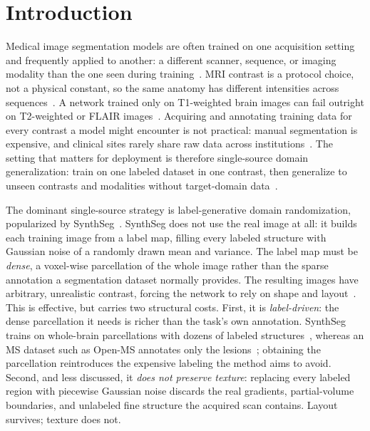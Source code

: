 \section{Introduction}
\label{sec:intro}

Medical image segmentation models are often trained on one acquisition
setting~\cite{guan2022dasurvey} and frequently applied to another: a different
scanner, sequence, or imaging modality than the one seen during
training~\cite{ghafoorian2017transfer,karani2018lifelong}. MRI contrast is a
protocol choice, not a physical constant, so the same anatomy has different
intensities across sequences~\cite{bitar2006pulsesequences}. A network trained only on
T1-weighted brain images can fail outright on T2-weighted or FLAIR
images~\cite{billot2023synthseg}. Acquiring and
annotating training data for every contrast a model might encounter is not
practical: manual segmentation is expensive, and clinical sites rarely share
raw data across institutions~\cite{liu2021feddg,wang2020dofe}. The setting that matters for deployment is therefore single-source domain
generalization: train on one labeled dataset in one contrast, then generalize
to unseen contrasts and modalities without target-domain
data~\cite{zhang2020bigaug,ouyang2022gin,su2023slaug,xu2021randconv}.

The dominant single-source strategy is label-generative domain randomization,
popularized by SynthSeg~\cite{billot2023synthseg}. SynthSeg does not use the
real image at all: it builds each training image from a label map, filling
every labeled structure with Gaussian noise of a randomly drawn mean and
variance. The label map must be \emph{dense}, a voxel-wise parcellation of
the whole image rather than the sparse annotation a segmentation dataset
normally provides. The resulting images have arbitrary, unrealistic contrast,
forcing the network to rely on shape and layout~\cite{billot2023synthseg}.
This is effective, but carries two structural costs. First, it is
\emph{label-driven}: the dense parcellation it needs is richer than the task's
own annotation. SynthSeg trains on whole-brain parcellations with dozens of
labeled structures~\cite{billot2023synthseg}, whereas an MS dataset such as
Open-MS annotates only the lesions~\cite{lesjak2018openms}; obtaining the
parcellation reintroduces the expensive labeling the method aims to avoid. Second, and less discussed, it
\emph{does not preserve texture}: replacing every labeled region with
piecewise Gaussian noise discards the real gradients, partial-volume
boundaries, and unlabeled fine structure the acquired scan contains. Layout
survives; texture does not.

